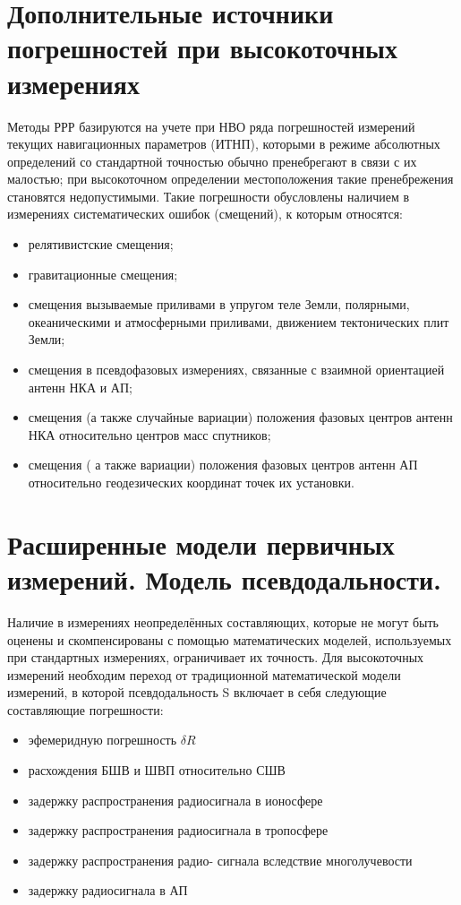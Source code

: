 \documentclass[14pt,a4paper,oneside]{extarticle}
\begin{document}
\section{Дополнительные источники погрешностей при высокоточных измерениях}

Методы РРР базируются на учете при НВО ряда погрешностей измерений текущих навигационных параметров (ИТНП), которыми в режиме абсолютных определений со стандартной точностью обычно пренебрегают в связи с их малостью; при высокоточном определении местоположения такие пренебрежения становятся недопустимыми. Такие погрешности обусловлены наличием в измерениях систематических ошибок (смещений), к которым относятся:

\begin{itemize}
    \item релятивистские смещения;
    \item гравитационные смещения;
    \item смещения вызываемые приливами в упругом теле Земли, полярными, океаническими и атмосферными приливами, движением тектонических плит Земли;
    \item смещения в псевдофазовых измерениях, связанные с взаимной ориентацией антенн НКА и АП;
    \item смещения (а также случайные вариации) положения фазовых центров антенн НКА относительно центров масс спутников;
    \item смещения ( а также вариации) положения фазовых центров антенн АП относительно геодезических координат точек их установки.
\end{itemize}

\section{Расширенные модели первичных измерений. Модель псевдодальности.}

Наличие в измерениях неопределённых составляющих, которые не могут быть оценены и скомпенсированы с помощью математических моделей, используемых при стандартных измерениях, ограничивает их точность. Для высокоточных измерений необходим переход от традиционной математической модели измерений, в которой псевдодальность S включает в себя следующие составляющие погрешности:

\begin{itemize}
    \item эфемеридную погрешность ${\delta}{R}$
    \item расхождения БШВ и ШВП относительно СШВ
    \item задержку распространения радиосигнала в ионосфере
    \item задержку распространения радиосигнала в тропосфере
    \item задержку распространения радио- сигнала вследствие многолучевости
    \item задержку радиосигнала в АП
\end{itemize}
\end{document}
